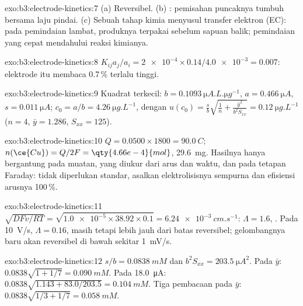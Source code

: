 \begin{solution}{exo:b3:electrode-kinetics:7}
(a) Reversibel. (b) : pemisahan puncaknya tumbuh bersama laju
pindai. (c) Sebuah tahap kimia menyusul transfer elektron (EC): pada pemindaian
lambat, produknya terpakai sebelum sapuan balik; pemindaian yang cepat
mendahului reaksi kimianya.
\end{solution}

\begin{solution}{exo:b3:electrode-kinetics:8}
$K_{ij}a_j/a_i = \num{2e-4} \times 0.14/\num{4.0e-3} = 0.007$: elektrode itu membaca 0.7\,\% terlalu tinggi.
\end{solution}

\begin{solution}{exo:b3:electrode-kinetics:9}
Kuadrat terkecil: $b = \qty{0.1093}{\micro A.L.\micro g^{-1}}$, $a = \qty{0.466}{\micro A}$,
$s = \qty{0.011}{\micro A}$; $c_0 = a/b =
\qty{4.26}{\micro g.L^{-1}}$, dengan $u(c_0) = \frac sb\sqrt{\frac1n + \frac{\bar y^2}{b^2S_{xx}}} = \qty{0.12}{\micro g.L^{-1}}$
($n = 4$, $\bar y = 1.286$, $S_{xx} = 125$).
\end{solution}

\begin{solution}{exo:b3:electrode-kinetics:10}
$Q = 0.0500 \times 1800 = \qty{90.0}{C}$; $n(\ce{Cu}) = Q/2F = \qty{4.66e-4}{mol}$, \qty{29.6}{mg}.
Hasilnya hanya bergantung pada muatan, yang diukur dari arus dan waktu, dan
pada tetapan Faraday: tidak diperlukan standar, asalkan elektrolisisnya
sempurna dan efisiensi arusnya 100\,\%.
\end{solution}

\begin{solution}{exo:b3:electrode-kinetics:11}
$\sqrt{DFv/RT} = \sqrt{\num{1.0e-5} \times 38.92 \times 0.1} = \qty{6.24e-3}{cm.s^{-1}}$:
$\Lambda = 1.6$, . Pada \qty{10}{V/s}, $\Lambda = 0.16$, masih
 tetapi lebih jauh dari batas reversibel; gelombangnya baru
akan reversibel di bawah sekitar \qty{1}{mV/s}.
\end{solution}

\begin{solution}{exo:b3:electrode-kinetics:12}
$s/b = \qty{0.0838}{mM}$ dan $b^2S_{xx} = \qty{203.5}{\micro A^2}$. Pada $\bar y$:
$0.0838\sqrt{1 + 1/7} = \qty{0.090}{mM}$. Pada \qty{18.0}{\micro A}:
$0.0838\sqrt{1.143 + 83.0/203.5} = \qty{0.104}{mM}$. Tiga pembacaan pada $\bar y$:
$0.0838\sqrt{1/3 + 1/7} = \qty{0.058}{mM}$.
\end{solution}

